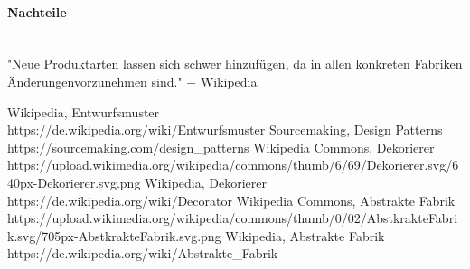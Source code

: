 \documentclass{school}
\begin{document}
\paragraph{Nachteile}~\\
"Neue Produktarten lassen sich schwer hinzufügen, da in allen konkreten Fabriken Änderungenvorzunehmen sind."
$-$ Wikipedia \cite{wiki-abstraktefabrik}

\newpage
\begin{thebibliography}{9}
 Wikipedia, Entwurfsmuster \\ https://de.wikipedia.org/wiki/Entwurfsmuster
 Sourcemaking, Design Patterns \\ https://sourcemaking.com/design\_patterns
 Wikipedia Commons, Dekorierer \\ https://upload.wikimedia.org/wikipedia/commons/thumb/6/69/Dekorierer.svg/640px-Dekorierer.svg.png
 Wikipedia, Dekorierer \\ https://de.wikipedia.org/wiki/Decorator
 Wikipedia Commons, Abstrakte Fabrik \\ https://upload.wikimedia.org/wikipedia/commons/thumb/0/02/AbstkrakteFabrik.svg/705px-AbstkrakteFabrik.svg.png
 Wikipedia, Abstrakte Fabrik \\ https://de.wikipedia.org/wiki/Abstrakte\_Fabrik
\end{thebibliography}
\end{document}
